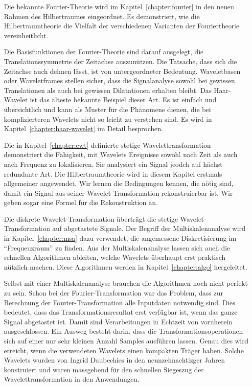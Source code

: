 Die bekannte Fourier-Theorie wird im Kapitel~\ref{chapter:fourier} in
den neuen Rahmen des Hilbertraumes eingeordnet.
Es demonstriert, wie die Hilbertraumtheorie die Vielfalt der 
verschiedenen Varianten der Fouriertheorie vereinheitlicht.

Die Basisfunktionen der Fourier-Theorie sind darauf ausgelegt,
die Translationssymmetrie der Zeitachse auszunützen.
Die Tatsache, dass sich die Zeitachse auch dehnen lässt, ist von
untergeordneter Bedeutung.
Waveletbasen oder Waveletframes stellen sicher, dass die Signalanalyse
sowohl bei gewissen Translationen als auch bei gewissen Dilatationen
erhalten bleibt.
%
%
Das Haar-Wavelet ist das älteste bekannte Beispiel dieser Art.
Es ist einfach und übersichtlich und kann als Muster für die
Phänomene dienen, die bei komplizierteren Wavelets nicht so leicht
zu verstehen sind.
Es wird in Kapitel~\ref{chapter:haar-wavelet} im Detail besprochen.

Die in Kapitel~\ref{chapter:cwt} definierte stetige Wavelettransformation
%
demonstriert die Fähigkeit, mit Wavelets Ereignisse sowohl nach Zeit
als auch nach Frequenz zu lokalisieren.
Sie analysiert ein Signal jeodch auf hächst redundante Art.
Die Hilbert\-raum\-theorie wird in diesem Kapitel erstmals allgemeiner
angewendet.
Wir lernen die Be\-ding\-ungen kennen, die nötig sind, damit ein Signal
aus seiner Wavelet-Transformation rekonstruierbar ist.
Wir geben sogar eine Formel für die Rekonstruktion an.

Die diskrete Wavelet-Transformation überträgt die stetige
Wavelet-Transformation auf abgetastete Signale.
Der Begriff der Multiskalenanalyse wird in Kapitel~\ref{chapter:msa}
dazu verwendet, die angemessene Diskretisierung im ``Frequenzraum''
zu finden.
Aus der Multiskalenanalyse lassen sich auch die schnellen Algorithmen
%
ableiten, welche Wavelets überhaupt erst praktisch nützlich machen.
Diese Algorithmen werden in Kapitel~\ref{chapter:algo} hergeleitet.

Selbst mit einer Multiskalenanalyse brauchen die Algorithmen noch nicht
perfekt zu sein.
Schon bei der Fourier-Transformation war das Problem, dass zur Berechnung
der Fourier-Trans\-for\-ma\-tion alle Inputdaten notwendig sind.
Dies bedeutet, dass das Transformationsresultat erst verfügbar ist,
wenn das ganze Signal abgetastet ist.
Damit sind Verarbeitungen in Echtzeit von vornherein ausgeschlossen.
Ein Ausweg besteht darin, dass die Transformationsoperationen sich auf
einer nur sehr kleinen Anzahl Samples ausführen lassen.
Genau dies wird erreicht, wenn die verwendeten Wavelets einen kompakten Träger
haben.
Solche Wavelets wurden von Ingrid Daubechies in den neunzehnachtizger
%
%
Jahren konstruiert und waren massgebend für den schnellen Siegeszug 
der Wavelettransformation in den Anwendungen.


